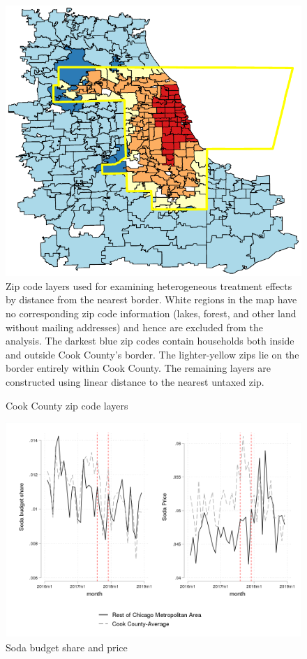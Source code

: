 \documentclass[12pt]{article}
\begin{document}
\clearpage
\begin{figure}[t]\centering
\caption{Cook County zip code layers} \label{cookzip}
	\includegraphics[width = \textwidth]{../figures/cookzips.pdf}
	\footnotesize Zip code layers used for examining heterogeneous treatment effects by distance from the nearest border. White regions in the map have no corresponding zip code information (lakes, forest, and other land without mailing addresses) and hence are excluded from the analysis. The darkest blue zip codes contain households both inside and outside Cook County's border. The lighter-yellow zips lie on the border entirely within Cook County. The remaining layers are constructed using linear distance to the nearest untaxed zip.
\end{figure}

\clearpage
\begin{figure}[t]\centering
\caption{Soda budget share and price} \label{soda_price}
\includegraphics[width = \textwidth]{../figures/server_output/soda_price_and_share.png}
\end{figure}
\end{document}
